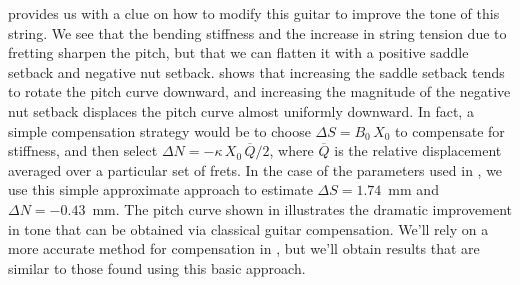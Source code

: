  provides us with a clue on how to modify this guitar to improve the tone of this string. We see that the bending stiffness and the increase in string tension due to fretting sharpen the pitch, but that we can flatten it with a positive saddle setback and negative nut setback.  shows that increasing the saddle setback tends to rotate the pitch curve downward, and increasing the magnitude of the negative nut setback displaces the pitch curve almost uniformly downward. In fact, a simple compensation strategy would be to choose $\Delta S = B_0\, X_0$ to compensate for stiffness, and then select $\Delta N = - \kappa\, X_0\, \overline{Q} / 2$, where $\overline{Q}$ is the relative displacement averaged over a particular set of frets. In the case of the parameters used in , we use this simple approximate approach to estimate $\Delta S = 1.74$~mm and $\Delta N = -0.43$~mm. The pitch curve shown in  illustrates the dramatic improvement in tone that can be obtained via classical guitar compensation. We'll rely on a more accurate method for compensation in , but we'll obtain results that are similar to those found using this basic approach.

